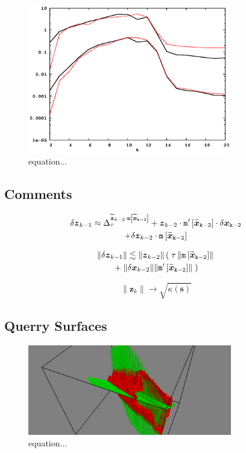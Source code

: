 \documentclass[letterpaper,twocolumn,amsmath,amsfont,amssymb,english,aps,jcp,preprintnumbers,groupaddress,nofootinbib,tightenlines]{revtex4}
\newcommand{\mat}[1]{\boldsymbol{#1}}
\begin{document}
\begin{figure}[h]
  \caption{equation...}
 \includegraphics[width=3.5in]{8x_33_nanotube_cond10_compare_errors.eps}
\end{figure}

\subsection{Comments}

\begin{multline}
 \delta {\mat{z}}_{k-1} \approx \Delta^{\widetilde{\mat{z}}_{k-2} \cdot \tt{m}\left[ \widetilde{\mat{x}}_{k-2}\right]}_\tau 
+ \mat{z}_{k-2} \cdot \tt{m}'\left[ \widetilde{\mat{x}}_{k-2}\right] \cdot \delta \mat{x}_{k-2} \\
+\delta \mat{z}_{k-2} \cdot \tt{m} \left[\widetilde{\mat{x}}_{k-2} \right] 
\end{multline}

\begin{multline}
\lVert \delta {\mat{z}}_{k-1} \rVert \lesssim
\lVert \mat{z}_{k-2} \rVert \left( \;  \tau \, \lVert \tt{m} \left[\widetilde{\mat{x}}_{k-2} \right]  \rVert \right.   \\ \left.
+ \; \lVert \delta {\mat{x}}_{k-2} \rVert   \lVert \tt{m}' \left[\widetilde{\mat{x}}_{k-2} \right] \rVert \; \right)
\end{multline}

\begin{equation}
\lVert \mat{z}_{k} \rVert  \rightarrow \sqrt{\kappa\left(\mat{s} \right)}
\end{equation}

\subsection{Querry Surfaces}

\begin{figure}[h]
  \caption{equation...}
 \includegraphics[width=3.5in]{snapshot.png}
\end{figure}
\end{document}
